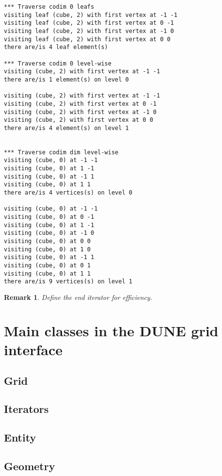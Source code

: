 \documentclass[11pt,a4paper,headinclude,footinclude,DIV14,BCOR8.25mm,titlepage,twoside,openright,normalheadings]{scrreprt}
\newtheorem{rem}[exc]{Remark}
\begin{document}
\begin{lstlisting}[basicstyle=\ttfamily\scriptsize]
*** Traverse codim 0 leafs
visiting leaf (cube, 2) with first vertex at -1 -1
visiting leaf (cube, 2) with first vertex at 0 -1
visiting leaf (cube, 2) with first vertex at -1 0
visiting leaf (cube, 2) with first vertex at 0 0
there are/is 4 leaf element(s)

*** Traverse codim 0 level-wise
visiting (cube, 2) with first vertex at -1 -1
there are/is 1 element(s) on level 0

visiting (cube, 2) with first vertex at -1 -1
visiting (cube, 2) with first vertex at 0 -1
visiting (cube, 2) with first vertex at -1 0
visiting (cube, 2) with first vertex at 0 0
there are/is 4 element(s) on level 1


*** Traverse codim dim level-wise
visiting (cube, 0) at -1 -1
visiting (cube, 0) at 1 -1
visiting (cube, 0) at -1 1
visiting (cube, 0) at 1 1
there are/is 4 vertices(s) on level 0

visiting (cube, 0) at -1 -1
visiting (cube, 0) at 0 -1
visiting (cube, 0) at 1 -1
visiting (cube, 0) at -1 0
visiting (cube, 0) at 0 0
visiting (cube, 0) at 1 0
visiting (cube, 0) at -1 1
visiting (cube, 0) at 0 1
visiting (cube, 0) at 1 1
there are/is 9 vertices(s) on level 1
\end{lstlisting}

\begin{rem} Define the end iterator for efficiency. 
\end{rem}

\chapter{Main classes in the DUNE grid interface}

\section{Grid}

\section{Iterators}

\section{Entity}

\section{Geometry}
\end{document}
